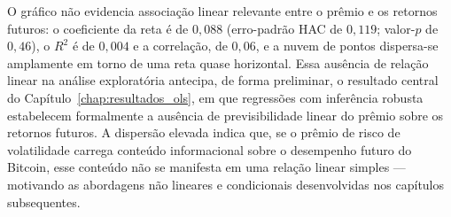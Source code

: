 O gráfico não evidencia associação linear relevante entre o prêmio e os
retornos futuros: o coeficiente da reta é de $0{,}088$ (erro-padrão HAC de
$0{,}119$; valor-$p$ de $0{,}46$), o $R^2$ é de $0{,}004$ e a correlação, de
$0{,}06$, e a nuvem de pontos dispersa-se amplamente em torno de uma reta quase
horizontal. Essa ausência de relação linear na análise exploratória antecipa,
de forma preliminar, o resultado central do Capítulo~\ref{chap:resultados_ols},
em que regressões com inferência robusta estabelecem formalmente a ausência de
previsibilidade linear do prêmio sobre os retornos futuros. A dispersão
elevada indica que, se o prêmio de risco de volatilidade carrega conteúdo
informacional sobre o desempenho futuro do Bitcoin, esse conteúdo não se
manifesta em uma relação linear simples --- motivando as abordagens não
lineares e condicionais desenvolvidas nos capítulos subsequentes.
